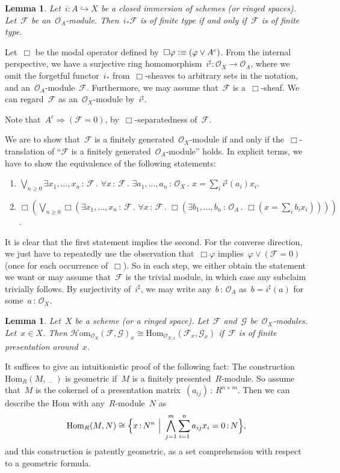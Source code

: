 \documentclass[10pt,reqno,a4paper]{amsbook}
\makeatletter
\theoremstyle{definition}
\theoremstyle{plain}
\newtheorem{lemma}[defn]{Lemma}
\theoremstyle{remark}
\newcommand{\F}{\mathcal{F}}
\renewcommand{\G}{\mathcal{G}}
\renewcommand{\O}{\mathcal{O}}
\newcommand{\Hom}{\mathrm{Hom}}
\newcommand{\HOM}{\mathcal{H}\mathrm{om}}
\newcommand{\placeholder}{\underline{\quad}}
\newcommand{\?}{\,{:}\,}
\renewcommand{\_}{\mathpunct{.}\,}
\newcommand{\defequiv}{\vcentcolon\equiv}
\renewenvironment{proof}[1][\proofname]{\par
  \pushQED{\qed}%
  \normalfont \topsep6\p@\@plus6\p@\relax
  \trivlist
  \item[\hskip\labelsep
        \itshape
    #1\@addpunct{.}]\ignorespaces
}{%
  \popQED\endtrivlist\@endpefalse
}
\makeatother
\begin{document}
\begin{lemma}\label{lemma:pushforward-finite-type}
Let~$i : A \hookrightarrow X$ be a closed immersion of schemes (or
ringed spaces). Let~$\F$ be an~$\O_A$-module. Then~$i_*\F$ is of finite type if
and only if~$\F$ is of finite type.\end{lemma}
\begin{proof}
Let~$\Box$ be the modal operator defined by~$\Box\varphi \defequiv (\varphi \vee
A^c)$. From the internal perspective, we have a surjective ring homomorphism~$i^\sharp
: \O_X \to \O_A$, where we omit the forgetful functor~$i_*$ from~$\Box$-sheaves
to arbitrary sets in the notation, and an~$\O_A$-module~$\F$. Furthermore, we
may assume that~$\F$ is a~$\Box$-sheaf. We can regard~$\F$ as an~$\O_X$-module
by~$i^\sharp$.

Note that~$A^c \Rightarrow (\F = 0)$, by~$\Box$-separatedness of~$\F$.

We are to show that~$\F$ is a finitely generated~$\O_X$-module if and only if
the~$\Box$-translation of ``$\F$ is a finitely generated~$\O_A$-module'' holds.
In explicit terms, we have to show the equivalence of the following statements:
\begin{enumerate}
\item $\bigvee_{n \geq 0} \exists x_1,\ldots,x_n\?\F\_
  \forall x\?\F\_ \exists a_1,\ldots,a_n\?\O_X\_ x = \sum_i i^\sharp(a_i) x_i$.
\item $\Box(\bigvee_{n \geq 0} \Box(\exists x_1,\ldots,x_n\?\F\_
  \forall x\?\F\_ \Box(\exists b_1,\ldots,b_n\?\O_A\_ \Box(
    x = \sum_i b_i x_i))))$.
\end{enumerate}
It is clear that the first statement implies the second. For the converse
direction, we just have to repeatedly use the observation that~$\Box\varphi$
implies~$\varphi \vee (\F = 0)$ (once for each occurrence of~$\Box$). So in each
step, we either obtain the statement we want or may assume
that~$\F$ is the trivial module, in which case any subclaim trivially follows. By
surjectivity of~$i^\sharp$, we may write any~$b\?\O_A$ as~$b =
i^\sharp(a)$ for some~$a\?\O_X$.
\end{proof}

\begin{lemma}\label{lemma:fp-hom-geometric}
Let~$X$ be a scheme (or a ringed space). Let~$\F$ and~$\G$ be~$\O_X$-modules. Let~$x
\in X$. Then $\HOM_{\O_X}(\F,\G)_x \cong \Hom_{\O_{X,x}}(\F_x,\G_x)$ if~$\F$ is
of finite presentation around~$x$.\end{lemma}
\begin{proof}It suffices to give an intuitionistic proof of the following fact:
The construction~$\Hom_R(M,\placeholder)$ is geometric if~$M$ is a finitely
presented~$R$-module. So assume that~$M$ is the cokernel of a presentation
matrix~$(a_{ij}) \? R^{n \times m}$. Then we can describe the Hom with
any~$R$-module~$N$ as
\[ \Hom_R(M,N) \cong \Bigl\{ x \? N^n \ \Big|\ \bigwedge_{j=1}^m \sum_{i=1}^n a_{ij}
x_i = 0 \? N \Bigr\}, \]
and this construction is patently geometric, as a set comprehension with respect to
a geometric formula.
\end{proof}
\end{document}
